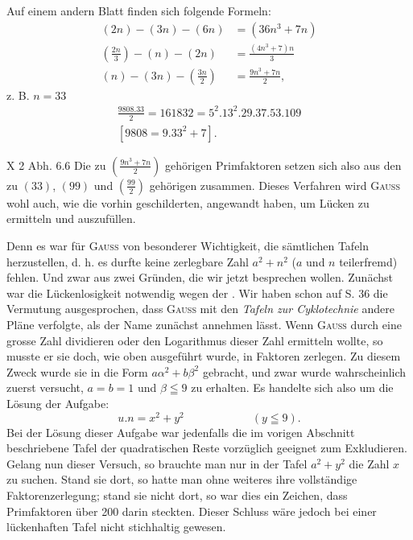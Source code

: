 \noindent\hspace*{\parindent}Auf einem andern Blatt finden sich folgende Formeln:
\[
\begin{aligned}
(2n)-(3n)-(6n)&=(36n^3+7n)\\
\left(\frac{2n}{3}\right)-(n)-(2n)&=\frac{(4n^3+7)n}{3}\\
(n)-(3n)-\left(\frac{3n}{2}\right)&=\frac{9n^3+7n}{2},
\end{aligned}
\]
\noindent z. B. $n=33$
\[
\begin{gathered}
\frac{9808\mathord{.}33}{2}=161832=5^2\mathord{.}13^2\mathord{.}29\mathord{.}37\mathord{.}53\mathord{.}109\\
[9808=9\mathord{.}33^2+7].
\end{gathered}
\]
\par\noindent X 2 Abh. 6.\hfill 6
\clearpage{}
\noindent\hspace*{\parindent}Die zu $\left(\frac{9n^3+7n}{2}\right)$ gehörigen Primfaktoren setzen sich also aus den zu $(33)$,
$(99)$ und $\left(\frac{99}{2}\right)$ gehörigen zusammen. Dieses Verfahren wird \textsc{Gauss} wohl auch,
wie die vorhin geschilderten, angewandt haben, um Lücken zu ermitteln und
auszufüllen.

Denn es war für \textsc{Gauss} von besonderer Wichtigkeit, die sämtlichen Tafeln
 herzustellen, d. h. es durfte keine zerlegbare Zahl $a^2+n^2$ ($a$ und
$n$ teilerfremd) fehlen. Und zwar aus zwei Gründen, die wir jetzt besprechen
wollen. Zunächst war die Lückenlosigkeit notwendig wegen der . Wir haben schon auf S. 36 die Vermutung ausgesprochen,
dass \textsc{Gauss} mit den \textit{Tafeln zur Cyklotechnie} andere Pläne verfolgte, als der
Name zunächst annehmen lässt. Wenn \textsc{Gauss} durch eine grosse Zahl dividieren oder den Logarithmus dieser Zahl ermitteln wollte, so musste er sie
doch, wie oben ausgeführt wurde, in Faktoren zerlegen. Zu diesem Zweck
wurde sie in die Form $a\alpha^2+b\beta^2$ gebracht, und zwar wurde wahrscheinlich
zuerst versucht, $a=b=1$ und $\beta\leqq9$ zu erhalten. Es handelte sich also um
die Lösung der Aufgabe:
\[
u\mathord{.}n=x^2+y^2\hspace{6em}(y\leqq9).
\]
\noindent Bei der Lösung dieser Aufgabe war jedenfalls die im vorigen Abschnitt beschriebene Tafel der quadratischen Reste vorzüglich geeignet zum Exkludieren.
Gelang nun dieser Versuch, so brauchte man nur in der Tafel $a^2+y^2$ die
Zahl $x$ zu suchen. Stand sie dort, so hatte man ohne weiteres ihre vollständige Faktorenzerlegung; stand sie nicht dort, so war dies ein Zeichen,
dass Primfaktoren über 200 darin steckten. Dieser Schluss wäre jedoch bei
einer lückenhaften Tafel nicht stichhaltig gewesen.

